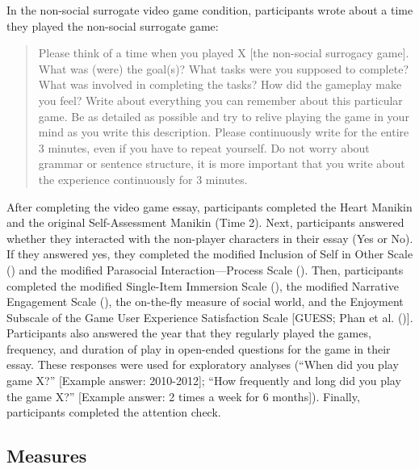 \documentclass[
]{udthesis}
\begin{document}
In the non-social surrogate video game condition, participants wrote about a time they played the non-social surrogate game:

\begin{quote}
Please think of a time when you played X {[}the non-social surrogacy game{]}. What was (were) the goal(s)? What tasks were you supposed to complete? What was involved in completing the tasks? How did the gameplay make you feel? Write about everything you can remember about this particular game. Be as detailed as possible and try to relive playing the game in your mind as you write this description. Please continuously write for the entire 3 minutes, even if you have to repeat yourself. Do not worry about grammar or sentence structure, it is more important that you write about the experience continuously for 3 minutes.
\end{quote}

After completing the video game essay, participants completed the Heart Manikin and the original Self-Assessment Manikin (Time 2). Next, participants answered whether they interacted with the non-player characters in their essay (Yes or No). If they answered yes, they completed the modified Inclusion of Self in Other Scale () and the modified Parasocial Interaction---Process Scale (). Then, participants completed the modified Single-Item Immersion Scale (), the modified Narrative Engagement Scale (), the on-the-fly measure of social world, and the Enjoyment Subscale of the Game User Experience Satisfaction Scale {[}GUESS; Phan et al. (){]}. Participants also answered the year that they regularly played the games, frequency, and duration of play in open-ended questions for the game in their essay. These responses were used for exploratory analyses (``When did you play game X?'' {[}Example answer: 2010-2012{]}; ``How frequently and long did you play the game X?'' {[}Example answer: 2 times a week for 6 months{]}). Finally, participants completed the attention check.

\subsection{Measures}\label{measures}
\end{document}
